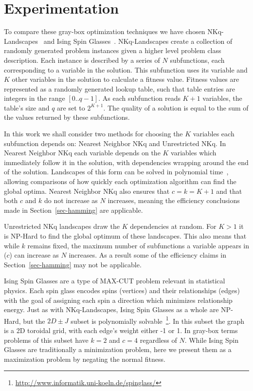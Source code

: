 \documentclass{sig-alternate}
\begin{document}
\section{Experimentation}
\label{sec-experiments}
To compare these gray-box optimization techniques we have chosen
NKq-Landscapes~\cite{chicano:2014:ball} and Ising Spin Glasses~\cite{saul:1994:spinglass}. NKq-Landscapes create
a collection of randomly generated problem instances given a
higher level problem class description. Each instance is described
by a series of $N$ subfunctions, each corresponding to a variable
in the solution. This subfunction uses its variable and $K$ other
variables in the solution to calculate a fitness value. Fitness values
are represented as a randomly generated lookup table, such that table
entries are integers in the range $[0..q-1]$. As each subfunction reads
$K+1$ variables, the table's size and $q$ are set to $2^{K+1}$. The quality
of a solution is equal to the sum of the values returned by these subfunctions.

In this work we shall consider two methods for choosing the $K$ variables
each subfunction depends on: Nearest Neighbor NKq and Unrestricted NKq.
In Nearest Neighbor NKq each variable depends on the $K$ variables which immediately follow
it in the solution, with dependencies wrapping around the end of the solution.
Landscapes of this form can be solved in polynomial
time~\cite{wright:2000:solvingnk}, allowing comparisons of how quickly each optimization
algorithm can find the global optima. Nearest Neighbor NKq also ensures that $c=k=K+1$
and that both $c$ and $k$ do not increase as $N$ increases, meaning the efficiency
conclusions made in Section~\ref{sec-hamming} are applicable.

Unrestricted NKq landscapes draw the $K$ dependencies at random. For $K > 1$ it is
NP-Hard to find the global optimum of these landscapes. This also means that while
$k$ remains fixed, the maximum number of subfunctions a variable appears in ($c$) can increase
as $N$ increases. As a result some of the efficiency claims in Section~\ref{sec-hamming}
may not be applicable.

Ising Spin Glasses are a type of MAX-CUT problem relevant in statistical physics. Each spin glass
encodes spins (vertices) and their relationships (edges) with the goal of assigning each spin a direction
which minimizes relationship energy. Just as with NKq-Landscapes, Ising Spin Glasses as a whole
are NP-Hard, but the $2D\pm J$ subset is polynomially solvable~\cite{saul:1994:spinglass}\footnote{\url{http://www.informatik.uni-koeln.de/spinglass/}}. In this
subset the graph is a 2D toroidal grid, with each edge's weight either -1 or 1. In gray-box terms
problems of this subset have $k=2$ and $c=4$ regardless of $N$. While Ising Spin Glasses are traditionally
a minimization problem, here we present them as a maximization problem by negating the normal fitness.
\end{document}
